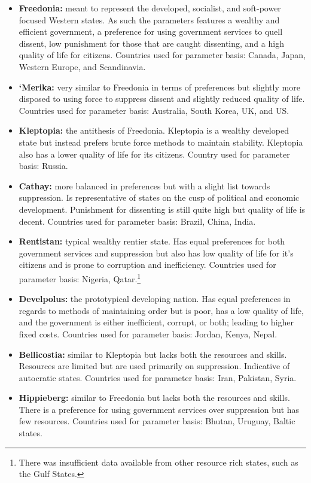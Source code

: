 \documentclass[12pt]{article}
\begin{document}
\begin{spacing}{1.5}
\begin{itemize}
	\item \textbf{Freedonia:} meant to represent the developed, socialist, and soft-power focused Western states. As such the parameters features a wealthy and efficient government, a preference for using government services to quell dissent, low punishment for those that are caught dissenting, and a high quality of life for citizens. Countries used for parameter basis: Canada, Japan, Western Europe, and Scandinavia. 
	\item \textbf{`Merika:} very similar to Freedonia in terms of preferences but slightly more disposed to using force to suppress dissent and slightly reduced quality of life. Countries used for parameter basis: Australia, South Korea, UK, and US. 
	\item \textbf{Kleptopia:} the antithesis of Freedonia. Kleptopia is a wealthy developed state but instead prefers brute force methods to maintain stability. Kleptopia also has a lower quality of life for its citizens. Country used for parameter basis: Russia.  
	\item \textbf{Cathay:} more balanced in preferences but with a slight list towards suppression. Is representative of states on the cusp of political and economic development. Punishment for dissenting is still quite high but quality of life is decent. Countries used for parameter basis: Brazil, China, India.   
	\item \textbf{Rentistan:} typical wealthy rentier state. Has equal preferences for both government services and suppression but also has low quality of life for it's citizens and is prone to corruption and inefficiency. Countries used for parameter basis: Nigeria, Qatar.\footnote{There was insufficient data available from other resource rich states, such as the Gulf States.} 
	\item \textbf{Develpolus:} the prototypical developing nation. Has equal preferences in regards to methods of maintaining order but is poor, has a low quality of life, and the government is either inefficient, corrupt, or both; leading to higher fixed costs. Countries used for parameter basis: Jordan, Kenya, Nepal.  	
	\item \textbf{Bellicostia:} similar to Kleptopia but lacks both the resources and skills. Resources are limited but are used primarily on suppression. Indicative of autocratic states.  Countries used for parameter basis: Iran, Pakistan, Syria. 
	\item \textbf{Hippieberg:} similar to Freedonia but lacks both the resources and skills. There is a preference for using government services over suppression but has few resources. Countries used for parameter basis: Bhutan, Uruguay, Baltic states.  
\end{itemize}


\end{spacing}
\end{document}
